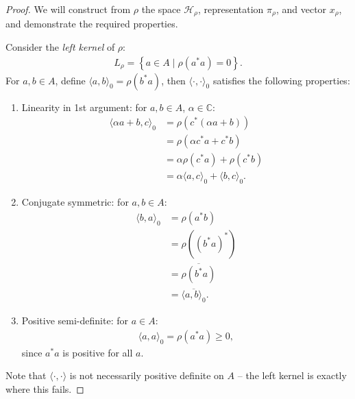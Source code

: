 \documentclass[11pt,a4paper]{report}
\theoremstyle{plain}
\theoremstyle{definition}
\newcommand{\1}{\mathbbm{1}}
\newcommand{\Hr}{\mathcal{H}_\rho}
\begin{document}
\begin{proof}
	We will construct from $\rho$ the space $\Hr$, representation $\pi_\rho$, and 
	vector $x_\rho$, and demonstrate the required properties.
	
	Consider the \emph{left kernel} of $\rho$:
	\begin{align*}
		L_\rho = \left\{a \in A \mid \rho (a ^\ast a) = 0 \right\}.
	\end{align*}	
	For $a,b \in A$, define $\langle a , b \rangle_0 = \rho(b^\ast a)$, then 
	$\langle \cdot, \cdot \rangle_0$ satisfies the following properties:
	\begin{enumerate}
	  \item Linearity in 1st argument: for $a,b\in A$, $\alpha \in \mathbb{C}$:
		\begin{align*}
		   \langle \alpha a +  b, c \rangle_0 
		&= \rho (c^\ast(\alpha a +  b)   		)										\\
		&= \rho (\alpha c^\ast a +  c^\ast b)  											\\
		&= \alpha \rho (c^\ast a) +  \rho (c^\ast b)									\\
		&= \alpha \langle a , c \rangle_0 +  \langle b, c \rangle_0.
		\end{align*}
	  \item Conjugate symmetric: for $a,b \in A$:
	  	\begin{align*}
	  	   \langle b,a \rangle _0 
	  	&= \rho (a^\ast b)																\\
	  	&= \rho ((b^\ast a)^\ast)														\\
	  	&= \overline{\rho (b^\ast a)}													\\
	  	&= \overline{\langle a,b \rangle _0 }.
	  	\end{align*}
	  \item Positive semi-definite: for $a \in A$:
	  	\begin{align*}
	  		\langle a,a\rangle_0 = \rho(a^\ast a) \geq 0,
	  	\end{align*}
	  	since $a^\ast a$ is positive for all $a$.
	\end{enumerate}
	Note that $\langle \cdot, \cdot \rangle$ is not necessarily positive definite on 
	$A$ -- the left kernel is exactly where this fails.
	

\end{proof}
\end{document}
